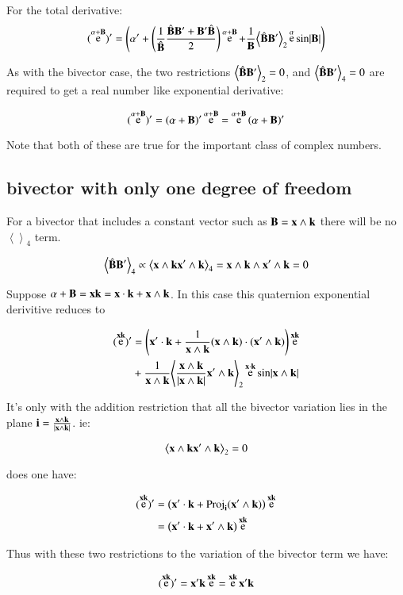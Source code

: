 \documentclass{article}      %
\DeclareMathOperator{\Exp}{e}
\newcommand{\Bcap}[0]{\hat{\BB}}
\newcommand{\Babs}[0]{\abs{\BB}}
\newcommand{\gpgrade}[2] {{\left\langle{{#1}}\right\rangle}_{#2}}
\newcommand{\gpgradetwo}[1] {\gpgrade{#1}{2}}
\newcommand{\gpgradefour}[1] {\gpgrade{#1}{4}}
\begin{document}
For the total derivative:
\begin{equation}
(\Exp^{\alpha + \BB})' 
= \left(\alpha' + \left(\inv{\Bcap}\frac{\Bcap\BB' + \BB'\Bcap}{2} \right) \Exp^{\alpha + \BB}
+ \inv{\BB}\gpgradetwo{\Bcap\BB'} \Exp^{\alpha} \sin\Babs \right) 
\end{equation}

As with the bivector case, the two restrictions 
$\gpgradetwo{\Bcap\BB'} = 0$, and $\gpgradefour{\Bcap\BB'} = 0$
are required to get a real number like exponential derivative:

\begin{equation}
(\Exp^{\alpha + \BB})' 
= \left(\alpha + \BB\right)' \Exp^{\alpha + \BB}
= \Exp^{\alpha + \BB} \left(\alpha + \BB\right)' 
\end{equation}

Note that both of these are true for the important class of complex numbers.

\subsection{ bivector with only one degree of freedom }

For a bivector that includes a constant vector such as $\mathbf{B} = \mathbf{x} \wedge \mathbf{k}$ there will be no 
$\gpgradefour{}$ term.

\[
\gpgradefour{\Bcap\BB'}
\propto \gpgradefour{\Bx \wedge \Bk \Bx' \wedge \Bk}
= \Bx \wedge \Bk \wedge \Bx' \wedge \Bk
= 0
\]

Suppose $\alpha + \mathbf{B} = \mathbf{x}\mathbf{k} = \mathbf{x} \cdot \mathbf{k} + \mathbf{x} \wedge \mathbf{k}$.  In this case
this quaternion exponential derivitive reduces to

\begin{align*}
(\Exp^{\Bx\Bk})' 
&= \left(\Bx' \cdot \Bk + \inv{\Bx \wedge \Bk} (\Bx \wedge \Bk) \cdot (\Bx' \wedge \Bk) \right) \Exp^{\Bx\Bk} \\
&+ \inv{\Bx \wedge \Bk}\gpgradetwo{\frac{\Bx \wedge \Bk}{\abs{\Bx \wedge \Bk}}\Bx' \wedge \Bk} \Exp^{\Bx \cdot \Bk} \sin\abs{\Bx \wedge \Bk} \\
\end{align*}

It's only with the addition restriction that all the bivector variation lies in the plane $\mathbf{i} = \frac{\mathbf{x} \wedge \mathbf{k} }{ \lvert{\mathbf{x}\wedge \mathbf{k}}\rvert }$.  ie:

\[
\gpgradetwo{\Bx \wedge \Bk \Bx' \wedge \Bk} = 0
\]

does one have:

\begin{align*}
(\Exp^{\Bx\Bk})' 
&= \left(\Bx' \cdot \Bk + \Proj_{\Bi}(\Bx' \wedge \Bk) \right) \Exp^{\Bx\Bk} \\
&= \left(\Bx' \cdot \Bk + \Bx' \wedge \Bk \right) \Exp^{\Bx\Bk} \\
\end{align*}

Thus with these two restrictions to the variation of the bivector term we have:

\begin{equation}
(\Exp^{\Bx\Bk})' = \Bx'\Bk \Exp^{\Bx\Bk} = \Exp^{\Bx\Bk} \Bx'\Bk 
\end{equation}
\end{document}
